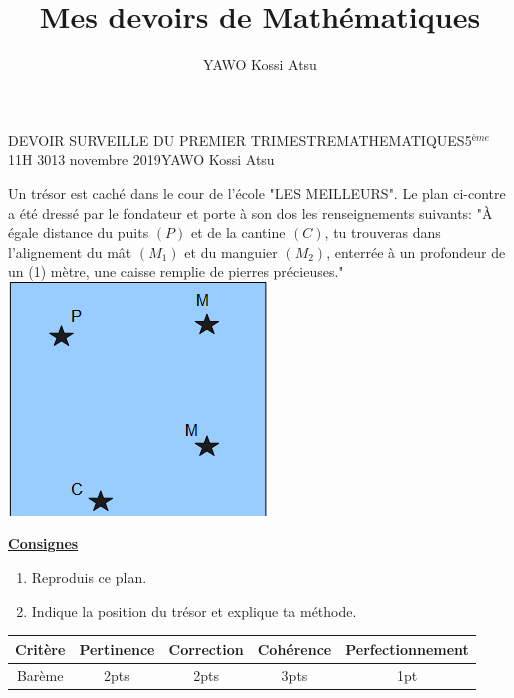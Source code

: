 \documentclass[12pt,a4paper]{book}
\author{YAWO Kossi Atsu}
\title{Mes devoirs de Mathématiques}
\newcommand{\prof}{YAWO Kossi Atsu}
\newcommand{\matiere}{MATHEMATIQUES}
\newcommand{\classe}{5$^{ème}$}
\begin{document}
\begin{devoir}{DEVOIR SURVEILLE DU PREMIER TRIMESTRE}{\matiere}{\classe}{1}{1H 30}{13 novembre 2019}{\prof}
\begin{exo}[8]
\begin{multicols}{2}
Un trésor est caché dans le cour de l'école "LES MEILLEURS". Le plan ci-contre a été dressé par le fondateur et porte à son dos les renseignements suivants: "À égale distance du puits $(P)$ et de la cantine $(C)$, tu trouveras dans l'alignement du mât $(M_1)$ et du manguier $(M_2)$, enterrée à un profondeur de un (1) mètre, une caisse remplie de pierres précieuses."\\

\includegraphics[scale=0.8]{images/dev120192020img1.png}
\end{multicols}

\vspace{0.5cm}
\underline{\textbf{Consignes}}\\
\begin{enumerate}
\item Reproduis ce plan.
\item Indique la position du trésor et explique ta méthode.
\end{enumerate}

\begin{tabular}{|c|c|c|c|c|}
\hline 
Critère & Pertinence & Correction & Cohérence & Perfectionnement \\ 
\hline
Barème & 2pts & 2pts & 3pts & 1pt \\ 
\hline 
\end{tabular}
\end{exo}


\end{devoir}
\end{document}
